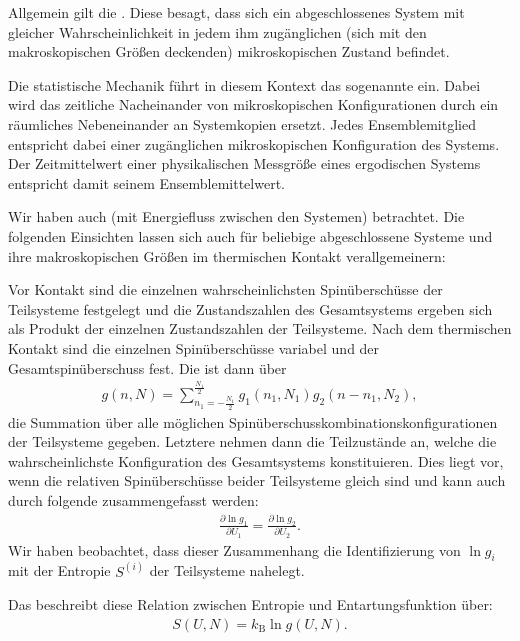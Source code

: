 \begin{summary}
    Allgemein gilt die . Diese besagt, dass sich ein abgeschlossenes System mit gleicher Wahrscheinlichkeit in jedem ihm zugänglichen (sich mit den makroskopischen Größen deckenden) mikroskopischen Zustand befindet.

    Die statistische Mechanik führt in diesem Kontext das sogenannte  ein. Dabei wird das zeitliche Nacheinander von mikroskopischen Konfigurationen durch ein räumliches Nebeneinander an Systemkopien ersetzt. Jedes Ensemblemitglied entspricht dabei einer zugänglichen mikroskopischen Konfiguration des Systems. Der Zeitmittelwert einer physikalischen Messgröße eines ergodischen Systems entspricht damit seinem Ensemblemittelwert.
   
    Wir haben auch  (mit Energiefluss zwischen den Systemen) betrachtet. Die folgenden Einsichten lassen sich auch für beliebige abgeschlossene Systeme und ihre makroskopischen Größen im thermischen Kontakt verallgemeinern:

    Vor Kontakt sind die einzelnen wahrscheinlichsten Spinüberschüsse der Teilsysteme festgelegt und die Zustandszahlen des Gesamtsystems ergeben sich als Produkt der einzelnen Zustandszahlen der Teilsysteme. Nach dem thermischen Kontakt sind die einzelnen Spinüberschüsse variabel und der Gesamtspinüberschuss fest. Die  ist dann über 
    \begin{align*}
        g(n,N) = \sum_{n_1=-\frac{N_1}{2}}^{\frac{N_1}{2}} g_1(n_1,N_1)g_2(n-n_1,N_2),
    \end{align*}
    die Summation über alle möglichen Spinüberschusskombinationskonfigurationen der Teilsysteme gegeben. 
    Letztere nehmen dann die Teilzustände an, welche die wahrscheinlichste Konfiguration des Gesamtsystems konstituieren. Dies liegt vor, wenn die relativen Spinüberschüsse beider Teilsysteme gleich sind und kann auch durch folgende  zusammengefasst werden:
    \begin{align}
        \frac{\partial \ln g_1}{\partial U_1}  = \frac{\partial \ln g_2}{\partial U_2}.
    \end{align}
    Wir haben beobachtet, dass dieser Zusammenhang die Identifizierung von $\ln g_i$ mit der Entropie $S^{(i)}$ der Teilsysteme nahelegt.
    
    Das  beschreibt diese Relation zwischen Entropie und Entartungsfunktion über: 
    \begin{align*}
        S(U,N)=k_\mathrm{B}\ln g(U,N).
    \end{align*}


\end{summary}

